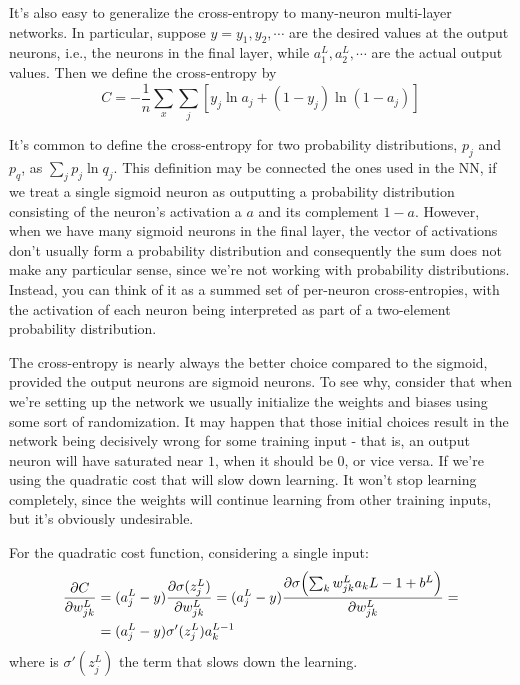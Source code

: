 \documentclass[12pt, letterpaper]{article}
\theoremstyle{definition}
\DeclarePairedDelimiter\autobracket{(}{)}
\newcommand{\br}[1]{\autobracket*{#1}}
\newcommand{\pr}{\mathrm{\partial}}
\begin{document}
It's also easy to generalize the cross-entropy to many-neuron multi-layer networks. In particular, suppose $y=y_1,y_2,\cdots$ are the desired values at the output neurons, i.e., the neurons in the final layer, while $a^L_1,a^L_2,\cdots$ are the actual output values. Then we define the cross-entropy by
\begin{equation}
C = -\frac{1}{n}\sum_x \sum_j  \left[ y_j \ln a_j + (1-y_j) \ln(1-a_j)\right]
\end{equation}

It's common to define the cross-entropy for two probability distributions, $p_j$  and $p_q$, as $\sum_j p_j \ln q_j$. This definition may be connected the ones used in the NN, if we treat a single sigmoid neuron as outputting a probability distribution consisting of the neuron's activation a $a$ and its complement $1-a$. However, when we have many sigmoid neurons in the final layer, the vector of activations don't usually form a probability distribution and consequently the sum does not make any particular sense, since we're not working with probability distributions. Instead, you can think of it as a summed set of per-neuron cross-entropies, with the activation of each neuron being interpreted as part of a two-element probability distribution.

The cross-entropy is nearly always the better choice compared to the sigmoid, provided the output neurons are sigmoid neurons. To see why, consider that when we're setting up the network we usually initialize the weights and biases using some sort of randomization. It may happen that those initial choices result in the network being decisively wrong for some training input - that is, an output neuron will have saturated near $1$, when it should be $0$, or vice versa. If we're using the quadratic cost that will slow down learning. It won't stop learning completely, since the weights will continue learning from other training inputs, but it's obviously undesirable.

For the quadratic cost function, considering a single input:
\begin{equation}
\begin{aligned}
\frac{\pr C}{\pr w_{jk}^L} &= (a_{j}^L-y) \frac{\pr \sigma(z_{j}^L)}{\pr w_{jk}^L}  =(a_{j}^L-y)  \frac{\pr \sigma\br{\sum_k w_{jk}^L a_k{L-1}+b^L}}{\pr w_{jk}^L} =
\\&= (a_{j}^L-y) \sigma'(z_j^L) a_k^{L-1}
\end{aligned}
\end{equation}
where is $\sigma'(z_j^L)$ the term that slows down the learning.
\end{document}
